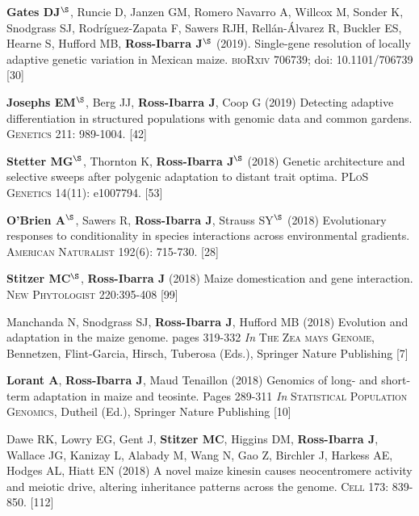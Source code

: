 \documentclass[letterpaper,10pt]{article}
\begin{document}
\begin{etaremune}
\item \textbf{Gates DJ}$^\S$, Runcie D, Janzen GM, Romero Navarro A,  Willcox M,  Sonder K, Snodgrass SJ, Rodr\'{i}guez-Zapata F,  Sawers RJH,  Rell\'{a}n-\'{A}lvarez R, Buckler ES, Hearne S, Hufford MB, \textbf{Ross-Ibarra J}$^\S$ (2019). Single-gene resolution of locally adaptive genetic variation in Mexican maize. \textsc{bioRxiv} 706739; doi: 10.1101/706739
 [30]\\

\item \textbf{Josephs EM}$^\S$, Berg JJ, \textbf{Ross-Ibarra J}, Coop G (2019) Detecting adaptive differentiation in structured populations with genomic data and common gardens. \textsc{Genetics} 211: 989-1004.
 [42]\\

\item \textbf{Stetter MG}$^\S$, Thornton K, \textbf{Ross-Ibarra J}$^\S$ (2018) Genetic architecture and selective sweeps after polygenic adaptation to distant trait optima. \textsc{PLoS Genetics} 14(11): e1007794. %
 [53]\\

\item \textbf{O'Brien A}$^\S$, Sawers R, \textbf{Ross-Ibarra J}, Strauss  SY$^\S$ (2018) Evolutionary responses to conditionality in species interactions across environmental gradients. \textsc{American Naturalist} 192(6): 715-730.
 [28]\\

\item \textbf{Stitzer MC}$^\S$, \textbf{Ross-Ibarra J} (2018) Maize domestication and gene interaction. \textsc{New Phytologist} 220:395-408
 [99]\\

\item Manchanda N, Snodgrass SJ, \textbf{Ross-Ibarra J}, Hufford MB (2018) Evolution and adaptation in the maize genome. pages 319-332 \textit{In} \textsc{The Zea mays Genome}, Bennetzen, Flint-Garcia, Hirsch, Tuberosa (Eds.), Springer Nature Publishing 
 [7]\\

\item \textbf{Lorant A}, \textbf{Ross-Ibarra J}, Maud Tenaillon (2018) Genomics of long- and short- term adaptation in maize and teosinte. Pages 289-311 \textit{In} \textsc{Statistical Population Genomics},  Dutheil (Ed.), Springer Nature Publishing 
 [10]\\

\item Dawe RK, Lowry EG, Gent J, \textbf{Stitzer MC}, Higgins DM, \textbf{Ross-Ibarra J}, Wallace JG, Kanizay L, Alabady M, Wang N, Gao Z, Birchler J, Harkess AE, Hodges AL, Hiatt EN (2018) A novel maize kinesin causes neocentromere activity and meiotic drive, altering inheritance patterns across the genome. \textsc{Cell} 173: 839-850.
 [112]\\


\end{etaremune}
\end{document}
